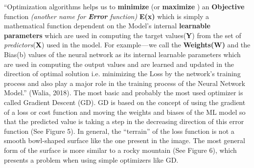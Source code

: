 “Optimization algorithms helps us to \textbf{minimize} (or \textbf{maximize} ) an \textbf{Objective} function \textit{(another name for \textbf{Error} function)} \textbf{E(x)} which is simply a mathematical function dependent on the Model’s internal \textbf{learnable parameters} which are used in computing the target values(\textbf{Y}) from the set of \textit{predictors}(\textbf{X}) used in the model. For example — we call the \textbf{Weights(W)} and the Bias(b) values of the neural network as its internal learnable parameters which are used in computing the output values and are learned and updated in the direction of optimal solution i.e. minimizing the Loss by the network’s training process and also play a major role in the training process of the Neural Network Model.” (Walia, 2018).
The most basic and probably the most used optimizer is called Gradient Descent (GD). GD is based on the concept of using the gradient of a loss or cost function and moving the weights and biases of the ML model so that the predicted value is taking a step in the decreasing direction of this error function (See Figure 5). In general, the “terrain” of the loss function is not a smooth bowl-shaped surface like the one present in the image. The most general form of the surface is more similar to a rocky mountain (See Figure 6), which presents a problem when using simple optimizers like GD.






